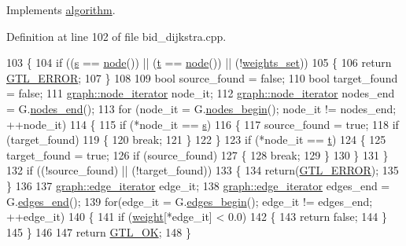 Implements \mbox{\hyperlink{classalgorithm_a76361fb03ad1cf643affc51821e43bed}{algorithm}}.



Definition at line 102 of file bid\+\_\+dijkstra.\+cpp.


\begin{DoxyCode}
103 \{
104     \textcolor{keywordflow}{if} ((\mbox{\hyperlink{classbid__dijkstra_a118e2ebd0d08ffc991c2bc578f8284a4}{s}} == \mbox{\hyperlink{classnode}{node}}()) || (\mbox{\hyperlink{classbid__dijkstra_a9370a71076d7807d1f3963e6dad9897e}{t}} == \mbox{\hyperlink{classnode}{node}}()) || (!\mbox{\hyperlink{classbid__dijkstra_a7636f90a27d14c9eb4b115e8dad05464}{weights\_set}}))
105     \{
106     \textcolor{keywordflow}{return} \mbox{\hyperlink{classalgorithm_af1a0078e153aa99c24f9bdf0d97f6710a6fcf574690bbd6cf710837a169510dd7}{GTL\_ERROR}};
107     \}
108 
109     \textcolor{keywordtype}{bool} source\_found = \textcolor{keyword}{false};
110     \textcolor{keywordtype}{bool} target\_found = \textcolor{keyword}{false};
111     \mbox{\hyperlink{classgraph_a2cb374b84c133ce13f94e73c3e5da7fa}{graph::node\_iterator}} node\_it;
112     \mbox{\hyperlink{classgraph_a2cb374b84c133ce13f94e73c3e5da7fa}{graph::node\_iterator}} nodes\_end = G.\mbox{\hyperlink{classgraph_abbf9c0cb5629e98e1142254911238173}{nodes\_end}}();
113     \textcolor{keywordflow}{for} (node\_it = G.\mbox{\hyperlink{classgraph_aec053a4b509d1be804237a80044c54c0}{nodes\_begin}}(); node\_it != nodes\_end; ++node\_it)
114     \{
115     \textcolor{keywordflow}{if} (*node\_it == \mbox{\hyperlink{classbid__dijkstra_a118e2ebd0d08ffc991c2bc578f8284a4}{s}})
116         \{
117         source\_found = \textcolor{keyword}{true};
118         \textcolor{keywordflow}{if} (target\_found)
119         \{
120         \textcolor{keywordflow}{break};
121         \}
122     \}
123     \textcolor{keywordflow}{if} (*node\_it == \mbox{\hyperlink{classbid__dijkstra_a9370a71076d7807d1f3963e6dad9897e}{t}})
124     \{
125         target\_found = \textcolor{keyword}{true};
126         \textcolor{keywordflow}{if} (source\_found)
127         \{
128         \textcolor{keywordflow}{break};
129         \}
130     \}
131     \}
132     \textcolor{keywordflow}{if} ((!source\_found) || (!target\_found))
133     \{
134     \textcolor{keywordflow}{return}(\mbox{\hyperlink{classalgorithm_af1a0078e153aa99c24f9bdf0d97f6710a6fcf574690bbd6cf710837a169510dd7}{GTL\_ERROR}});
135     \}
136 
137     \mbox{\hyperlink{classgraph_a818d3766018eb0af91d520ce2150203c}{graph::edge\_iterator}} edge\_it;
138     \mbox{\hyperlink{classgraph_a818d3766018eb0af91d520ce2150203c}{graph::edge\_iterator}} edges\_end = G.\mbox{\hyperlink{classgraph_aea8d7f976b85b6137f52d915e26639f6}{edges\_end}}();
139     \textcolor{keywordflow}{for}(edge\_it = G.\mbox{\hyperlink{classgraph_a7ba35a4c4e8343ffb27ed6d9703c6f18}{edges\_begin}}(); edge\_it != edges\_end; ++edge\_it)
140     \{
141     \textcolor{keywordflow}{if} (\mbox{\hyperlink{classbid__dijkstra_a477c4f7ce631df84c832cb7d517cd243}{weight}}[*edge\_it] < 0.0)
142     \{
143         \textcolor{keywordflow}{return} \textcolor{keyword}{false};
144     \}
145     \}
146 
147     \textcolor{keywordflow}{return} \mbox{\hyperlink{classalgorithm_af1a0078e153aa99c24f9bdf0d97f6710a5114c20e4a96a76b5de9f28bf15e282b}{GTL\_OK}};
148 \}
\end{DoxyCode}
